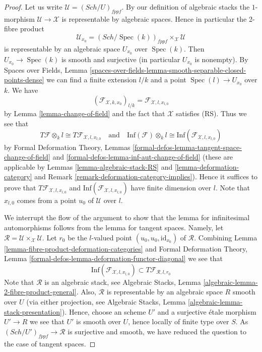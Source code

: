 \documentclass{stacks-project}
\theoremstyle{plain}
\theoremstyle{definition}
\theoremstyle{remark}
\numberwithin{equation}{subsection}
\def\Spec{\mathop{\mathrm{Spec}}}
\def\Sch{\mathit{Sch}}
\begin{document}
\begin{proof}
Let us write $\mathcal{U} = (\Sch/U)_{fppf}$. By our definition
of algebraic stacks the $1$-morphism $\mathcal{U} \to \mathcal{X}$
is representable by algebraic spaces. Hence in particular the
2-fibre product
$$
\mathcal{U}_{x_0} = (\Sch/\Spec(k))_{fppf} \times_\mathcal{X} \mathcal{U}
$$
is representable by an algebraic space $U_{x_0}$ over $\Spec(k)$. Then
$U_{x_0} \to \Spec(k)$ is smooth and surjective (in particular $U_{x_0}$
is nonempty). By Spaces over Fields, Lemma
\ref{spaces-over-fields-lemma-smooth-separable-closed-points-dense}
we can find a finite extension $l/k$ and a point
$\Spec(l) \to U_{x_0}$ over $k$. We have
$$
(\mathcal{F}_{\mathcal{X}, k , x_0})_{l/k} =
\mathcal{F}_{\mathcal{X}, l, x_{l, 0}}
$$
by Lemma \ref{lemma-change-of-field} and the fact that $\mathcal{X}$
satisfies (RS). Thus we see that
$$
T\mathcal{F} \otimes_k l \cong T\mathcal{F}_{\mathcal{X}, l, x_{l, 0}}
\quad\text{and}\quad
\text{Inf}(\mathcal{F}) \otimes_k l \cong
\text{Inf}(\mathcal{F}_{\mathcal{X}, l, x_{l, 0}})
$$
by
Formal Deformation Theory, Lemmas
\ref{formal-defos-lemma-tangent-space-change-of-field} and
\ref{formal-defos-lemma-inf-aut-change-of-field}
(these are applicable by
Lemmas \ref{lemma-algebraic-stack-RS} and
\ref{lemma-deformation-category} and
Remark \ref{remark-deformation-category-implies}).
Hence it suffices to prove that $T\mathcal{F}_{\mathcal{X}, l, x_{l, 0}}$
and $\text{Inf}(\mathcal{F}_{\mathcal{X}, l, x_{l, 0}})$
have finite dimension over $l$. Note that $x_{l, 0}$ comes from a point
$u_0$ of $\mathcal{U}$ over $l$.

\medskip\noindent
We interrupt the flow of the argument to show that the lemma for
infinitesimal automorphisms follows from the lemma for tangent spaces.
Namely, let
$\mathcal{R} = \mathcal{U} \times_\mathcal{X} \mathcal{U}$.
Let $r_0$ be the $l$-valued point $(u_0, u_0, \text{id}_{x_0})$ of
$\mathcal{R}$. Combining
Lemma \ref{lemma-fibre-product-deformation-categories} and
Formal Deformation Theory, Lemma
\ref{formal-defos-lemma-deformation-functor-diagonal}
we see that
$$
\text{Inf}(\mathcal{F}_{\mathcal{X}, l, x_{l, 0}})
\subset
T\mathcal{F}_{\mathcal{R}, l, r_0}
$$
Note that $\mathcal{R}$ is an algebraic stack, see
Algebraic Stacks, Lemma \ref{algebraic-lemma-2-fibre-product-general}.
Also, $\mathcal{R}$ is representable by an algebraic space $R$
smooth over $U$ (via either projection, see
Algebraic Stacks, Lemma \ref{algebraic-lemma-stack-presentation}).
Hence, choose an scheme $U'$ and a surjective \'etale morphism
$U' \to R$ we see that $U'$ is smooth over $U$, hence locally of
finite type over $S$. As $(\Sch/U')_{fppf} \to \mathcal{R}$ is
surjective and smooth, we have reduced the question to the case
of tangent spaces.


\end{proof}
\end{document}
